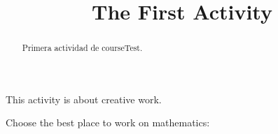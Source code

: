 \documentclass{ximera}
\title{The First Activity}
\begin{document}
  
\begin{abstract}  
	Primera actividad de courseTest.
\end{abstract}  
\maketitle  

This activity is about creative work.  
\begin{exercise}  
  Choose the best place to work on mathematics:
  \begin{multipleChoice}  
  \end{multipleChoice}  
\end{exercise}  
\end{document}
